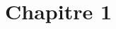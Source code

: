 \documentclass[12pt,a4paper,titlepage]{article}
\begin{document}
\pagestyle{fancy}
\fancyhf{} %
\fancyfoot[R]{\footnotesize{}} %
\renewcommand{\headrulewidth}{0pt} %

\noindent
\section*{}
\subsection*{}
\vspace{-0.62mm}
\section*{Chapitre 1}
\end{document}
